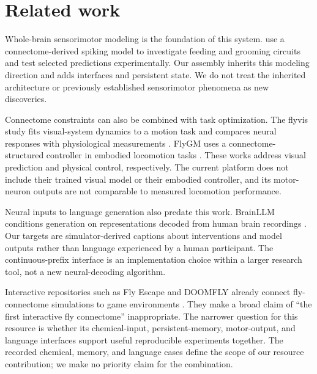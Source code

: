 \section{Related work}
Whole-brain sensorimotor modeling is the foundation of this system. \citet{shiu2024} use a connectome-derived spiking model to investigate feeding and grooming circuits and test selected predictions experimentally. Our assembly inherits this modeling direction and adds interfaces and persistent state. We do not treat the inherited architecture or previously established sensorimotor phenomena as new discoveries.

Connectome constraints can also be combined with task optimization. The flyvis study fits visual-system dynamics to a motion task and compares neural responses with physiological measurements \citep{lappalainen2024}. FlyGM uses a connectome-structured controller in embodied locomotion tasks \citep{jin2026}. These works address visual prediction and physical control, respectively. The current platform does not include their trained visual model or their embodied controller, and its motor-neuron outputs are not comparable to measured locomotion performance.

Neural inputs to language generation also predate this work. BrainLLM conditions generation on representations decoded from human brain recordings \citep{ye2025}. Our targets are simulator-derived captions about interventions and model outputs rather than language experienced by a human participant. The continuous-prefix interface is an implementation choice within a larger research tool, not a new neural-decoding algorithm.

Interactive repositories such as Fly Escape and DOOMFLY already connect fly-connectome simulations to game environments \citep{flyescape,doomfly}. They make a broad claim of ``the first interactive fly connectome'' inappropriate. The narrower question for this resource is whether its chemical-input, persistent-memory, motor-output, and language interfaces support useful reproducible experiments together. The recorded chemical, memory, and language cases define the scope of our resource contribution; we make no priority claim for the combination.
